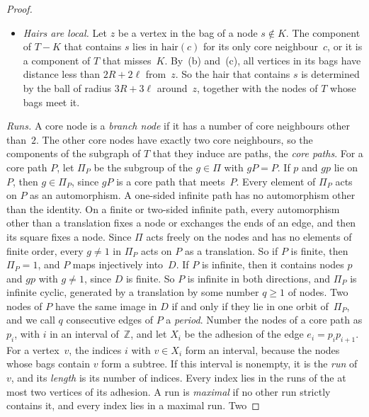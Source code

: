 \documentclass[11pt]{article}
\theoremstyle{remark}
\begin{document}
\begin{proof}
\begin{itemize}
  that is, a node of $D_v$ for every $v$, chosen by the identifiers in the bags of $D_v$, and lift it. Then the vertices owned by the hairs of
  pairwise inequivalent core nodes project to disjoint sets, and injectively.
\item[(e)] \emph{Hairs are local.} Let $z$ be a vertex in the bag of a node $s\notin K$. The component
  of $T-K$ that contains $s$ lies in $\mathrm{hair}(c)$ for its only core neighbour~$c$, or it is a
  component of $T$ that misses~$K$. By~(b) and~(c), all vertices in its bags have distance less than
  $2R+2\ell$ from~$z$. So the hair that contains $s$ is determined by the ball of radius $3R+3\ell$
  around~$z$, together with the nodes of $T$ whose bags meet it.
\end{itemize}

\emph{Runs.} A core node is a \emph{branch node} if it has a number of core neighbours other
than~$2$. The other core nodes have exactly two core neighbours, so the components of the subgraph
of $T$ that they induce are paths, the \emph{core paths}. For a core path $P$, let $\Pi_P$ be the
subgroup of the $g\in\Pi$ with $gP=P$. If $p$ and $gp$ lie on $P$, then $g\in\Pi_P$, since $gP$ is a
core path that meets~$P$. Every element of $\Pi_P$ acts on $P$ as an automorphism. A one-sided
infinite path has no automorphism other than the identity. On a finite or two-sided infinite path,
every automorphism other than a translation fixes a node or exchanges the ends of an edge, and then
its square fixes a node. Since $\Pi$ acts freely on the nodes and has no elements of finite order,
every $g\ne1$ in $\Pi_P$ acts on $P$ as a translation. So if $P$ is finite, then $\Pi_P=1$, and $P$
maps injectively into~$D$. If $P$ is infinite, then it contains nodes $p$ and $gp$ with $g\ne1$, since
$D$ is finite. So $P$ is infinite in both directions, and $\Pi_P$ is infinite cyclic, generated by a
translation by some number $q\ge1$ of nodes. Two nodes of $P$ have the same image in $D$ if and only
if they lie in one orbit of~$\Pi_P$, and we call $q$ consecutive edges of $P$ a \emph{period}. Number
the nodes of a core path as $p_i$, with $i$ in an interval of~$\mathbb Z$, and let $X_i$ be the adhesion of the edge $e_i=p_ip_{i+1}$. For a vertex~$v$, the
indices $i$ with $v\in X_i$ form an interval, because the nodes whose bags contain $v$ form a subtree.
If this interval is nonempty, it is the \emph{run} of~$v$, and its \emph{length} is its number of
indices. Every index lies in the runs of the at most two vertices of its adhesion. A run is
\emph{maximal} if no other run strictly contains it, and every index lies in a maximal run. Two

\end{proof}
\end{document}
